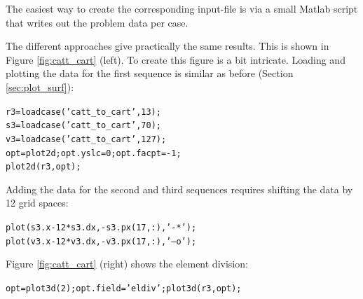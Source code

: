 \documentclass[12pt]{report}
\begin{document}
The easiest way to create the corresponding input-file is via a small
Matlab script that writes out the problem data per case.

The different approaches give practically the same results. This is shown 
in Figure \ref{fig:catt_cart} (left). To create this figure is a bit
intricate. Loading and plotting the data for the first sequence is similar
as before (Section \ref{sec:plot_surf}):
\begin{alltt}\small
r3=loadcase('catt_to_cart',13);  %
s3 = loadcase('catt_to_cart',70);  %
v3 = loadcase('catt_to_cart',127); %
opt=plot2d; opt.yslc=0; opt.facpt=-1;
plot2d(r3,opt);
\end{alltt}
Adding the data for the second and third sequences requires shifting the
data by 12 grid spaces:
\begin{alltt}\small
plot(s3.x-12*s3.dx, -s3.px(17,:), '-*');  %
plot(v3.x-12*v3.dx, -v3.px(17,:), '--o');
\end{alltt}
Figure \ref{fig:catt_cart} (right) shows the element division:
\begin{alltt}\small
opt=plot3d(2); opt.field='eldiv'; plot3d(r3,opt);
\end{alltt}
\end{document}
